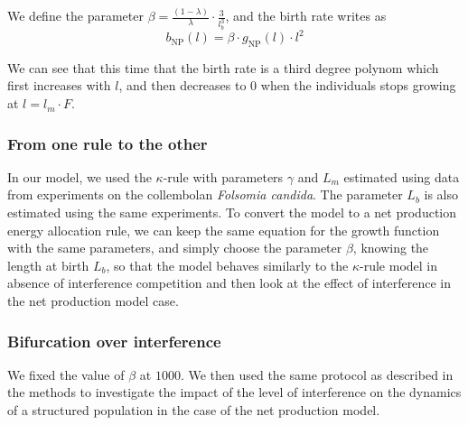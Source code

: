 We define the parameter ${\displaystyle \beta=\frac{(1-\lambda)}{\lambda}\cdot\frac{3}{l_b^{3}}}$,
and the birth rate writes as
\[
b_{\text{NP}}(l)=\beta\cdot g_{\text{NP}}(l)\cdot l^{2}
\]


We can see that this time that the birth rate is a third degree polynom
which first increases with $l$, and then decreases to $0$ when the
individuals stops growing at $l=l_m\cdot F$.

\subsubsection{From one rule to the other}

In our model, we used the $\kappa$-rule with parameters $\gamma$ and $L_m$
estimated using data from experiments on the collembolan \textit{Folsomia
candida}.
The parameter $L_b$ is also estimated using the same experiments. To convert the
model to a net production energy allocation rule, we can keep the same equation for
the growth function with the same parameters, and simply choose the parameter
$\beta$, knowing the length at birth $L_b$, so that the model behaves similarly
to the $\kappa$-rule model in absence of interference competition and then look at the
effect of interference in the net production model case.

\subsubsection{Bifurcation over interference}

We fixed the value of $\beta$ at $1000$. We then used the same protocol as
described in the methods to investigate the impact of the level of interference on the
dynamics of a structured population in the case of the net production model.

